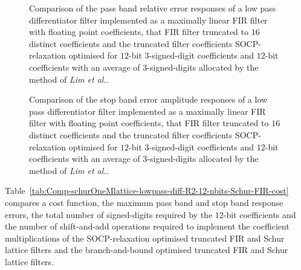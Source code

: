 \documentclass[a4paper,twoside,10pt,english]{article}
\newcommand{\DesignOfSchurLatticeFiltersPdfScale}{1}
\begin{document}
\begin{figure}
\centering
\scalebox{\DesignOfSchurLatticeFiltersPdfScale}{}
\caption{Comparison of the pass band relative error responses of a low pass
  differentiator filter implemented as a maximally linear FIR filter with
  floating point coefficients, that FIR filter truncated to $16$ distinct
  coefficients and the truncated filter coefficients SOCP-relaxation optimised
  for $12$-bit $3$-signed-digit coefficients and $12$-bit coefficients with an
  average of $3$-signed-digits allocated by the method of \emph{Lim et al.}.}
\label{fig:Comp-schurOneMlattice-lowpass-diff-R2-12-nbits-hM-min-pass-relative}
\end{figure}

\begin{figure}
\centering
\scalebox{\DesignOfSchurLatticeFiltersPdfScale}{}
\caption{Comparison of the stop band error amplitude responses of a low pass
  differentiator filter implemented as a maximally linear FIR filter with
  floating point coefficients, that FIR filter truncated to $16$ distinct
  coefficients and the truncated filter coefficients SOCP-relaxation optimised
  for $12$-bit $3$-signed-digit coefficients and $12$-bit coefficients with an
  average of $3$-signed-digits allocated by the method of \emph{Lim et al.}.}
\label{fig:Comp-schurOneMlattice-lowpass-diff-R2-12-nbits-hM-min-stop}
\end{figure}

Table~\ref{tab:Comp-schurOneMlattice-lowpass-diff-R2-12-nbits-Schur-FIR-cost}
compares a cost function, the maximum pass band and stop band response errors,
the total number of
signed-digits required by the $12$-bit coefficients and the number of
shift-and-add operations required to
implement the coefficient multiplications of the SOCP-relaxation optimised
truncated FIR and Schur lattice filters and the branch-and-bound optimised
truncated FIR and Schur lattice filters.
\end{document}
